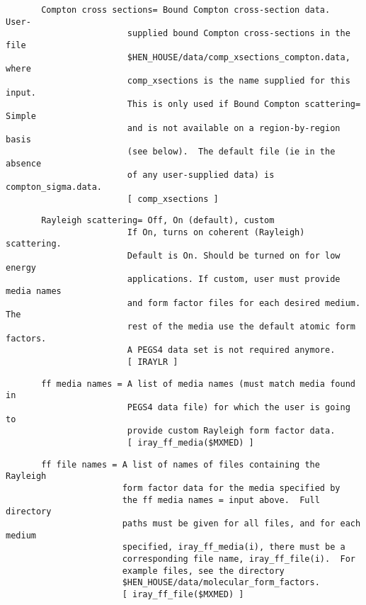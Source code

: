 \begin{verbatim}
       Compton cross sections= Bound Compton cross-section data.  User-
                        supplied bound Compton cross-sections in the file
                        $HEN_HOUSE/data/comp_xsections_compton.data, where
                        comp_xsections is the name supplied for this input.
                        This is only used if Bound Compton scattering= Simple
                        and is not available on a region-by-region basis
                        (see below).  The default file (ie in the absence
                        of any user-supplied data) is compton_sigma.data.
                        [ comp_xsections ]
\end{verbatim}
\begin{verbatim}
       Rayleigh scattering= Off, On (default), custom
                        If On, turns on coherent (Rayleigh) scattering.
                        Default is On. Should be turned on for low energy
                        applications. If custom, user must provide media names
                        and form factor files for each desired medium. The
                        rest of the media use the default atomic form factors.
                        A PEGS4 data set is not required anymore.
                        [ IRAYLR ]
\end{verbatim}
\begin{verbatim}
       ff media names = A list of media names (must match media found in
                        PEGS4 data file) for which the user is going to
                        provide custom Rayleigh form factor data.
                        [ iray_ff_media($MXMED) ]
\end{verbatim}
\begin{verbatim}
       ff file names = A list of names of files containing the Rayleigh
                       form factor data for the media specified by
                       the ff media names = input above.  Full directory
                       paths must be given for all files, and for each medium
                       specified, iray_ff_media(i), there must be a
                       corresponding file name, iray_ff_file(i).  For
                       example files, see the directory
                       $HEN_HOUSE/data/molecular_form_factors.
                       [ iray_ff_file($MXMED) ]
\end{verbatim}
